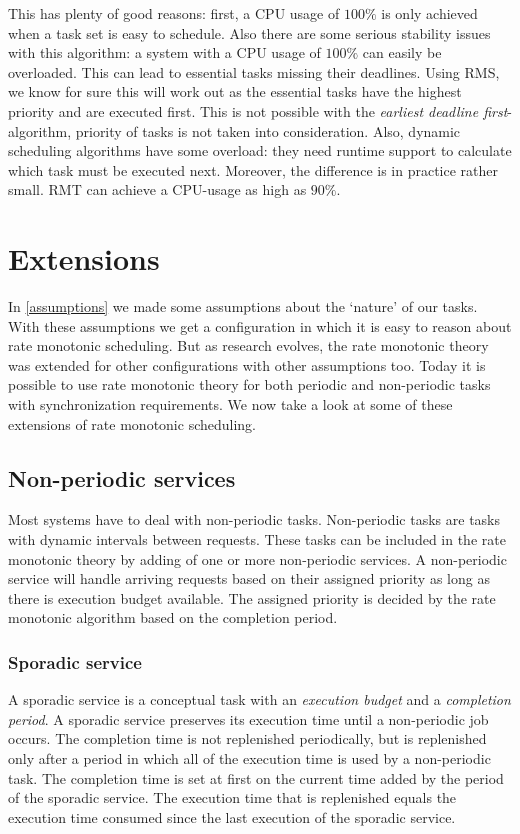 \documentclass[a4paper,12pt]{article}
\theoremstyle{definition}
\begin{document}
 This has plenty of good reasons: first, a CPU usage of $100\%$ 
 is only achieved when a task set is easy to schedule. Also there are some 
 serious stability issues with this algorithm: a system with a CPU usage of $100\%$ 
 can easily be overloaded. This can lead to essential tasks missing their 
 deadlines. Using RMS, we know for sure this will work out as the essential 
 tasks have the highest priority and are executed first. This is not possible 
 with the  \emph{earliest deadline first}-algorithm, priority of tasks is not 
 taken into consideration. Also, dynamic scheduling algorithms have some overload: they need 
 runtime support to calculate which task must be executed next. Moreover, the 
 difference is in practice rather small. RMT can achieve a CPU-usage as high as 
 $90\%$.
  
 
\newpage
\section{Extensions}
In \ref{assumptions} we made some assumptions about the `nature' of our tasks. With these assumptions we get a 
configuration in which it is easy to reason about rate monotonic scheduling.  
But as research evolves, the rate monotonic theory was extended for other 
configurations with other assumptions too. Today it is possible to use rate 
monotonic theory for both periodic and non-periodic tasks with synchronization 
requirements. We now take a look at some of these extensions of rate monotonic 
scheduling.

\subsection{Non-periodic services}
Most systems have to deal with non-periodic tasks. Non-periodic tasks are tasks 
with dynamic intervals between requests. These tasks can be included in the rate 
monotonic theory by adding of one or more non-periodic services. A 
non-periodic service will handle arriving requests based on their assigned 
priority as long as there is execution budget available. The assigned priority 
is decided by the rate monotonic algorithm based on the completion period.
\subsubsection{Sporadic service}
A sporadic service is a conceptual task with an \emph{execution budget} and a \emph{completion
period}. 
A sporadic service preserves its execution time until a non-periodic job 
occurs. The completion time is not replenished periodically, but is replenished only 
after a period in which all of the execution time is used by a non-periodic 
task. The completion time is set at first on the current time added by the 
period of the sporadic service. The execution time that is replenished equals the 
execution time consumed since the last execution of the sporadic service. 
\end{document}
